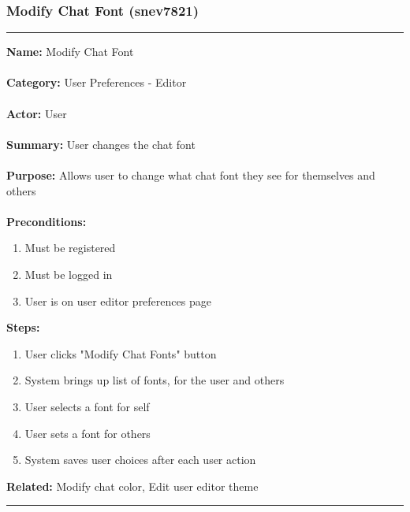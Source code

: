 \documentclass[11pt]{report}
\begin{document}
\subsubsection{Modify Chat Font (snev7821)}
\vspace{2pt}
\hrule
\vspace{8pt}
	\noindent\textbf{Name:} Modify Chat Font \\ \\
	\textbf{Category:} User Preferences - Editor  \\ \\
	\textbf{Actor:} User \\ \\
	\textbf{Summary:} User changes the chat font \\ \\
	\textbf{Purpose:} Allows user to change what chat font they see for themselves and others \\ \\
	\textbf{Preconditions:} 
	\begin{enumerate}
		\item Must be registered
		\item Must be logged in
		\item User is on user editor preferences page
	\end{enumerate}
	\textbf{Steps:}
	\begin{enumerate}
		\item User clicks "Modify Chat Fonts" button
		\item System brings up list of fonts, for the user and others
		\item User selects a font for self
		\item User sets a font for others
		\item System saves user choices after each user action
	\end{enumerate}
	\textbf{Related:} Modify chat color, Edit user editor theme
\vspace{8pt}
\hrule

\newpage
\end{document}
